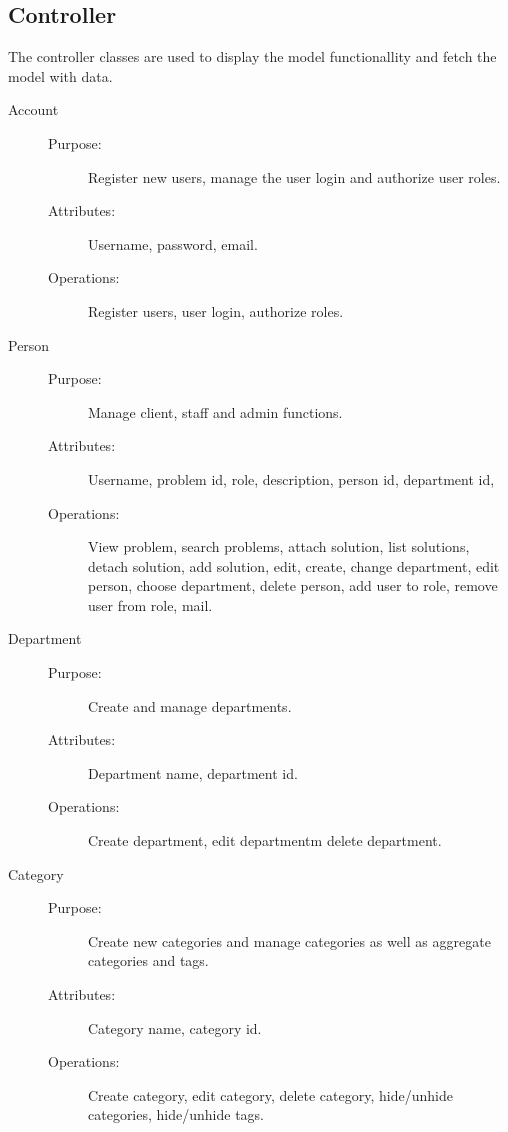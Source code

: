 \subsection{Controller}

The controller classes are used to display the model functionallity and fetch the model with data.

\begin{description}
\item[Account]\hfill
\begin{description}
\item[Purpose:]Register new users, manage the user login and authorize user roles.
\item[Attributes:]Username, password, email.
\item[Operations:]Register users, user login, authorize roles.
\end{description}
\end{description}

\begin{description}
\item[Person]\hfill
\begin{description}
\item[Purpose:]Manage client, staff and admin functions.
\item[Attributes:]Username, problem id, role, description, person id, department id, 
\item[Operations:]View problem, search problems, attach solution, list solutions, detach solution, add solution, edit, create, change department, edit person, choose department, delete person, add user to role, remove user from role, mail.
\end{description}
\end{description}

\begin{description}
\item[Department]\hfill
\begin{description}
\item[Purpose:]Create and manage departments.
\item[Attributes:]Department name, department id.
\item[Operations:]Create department, edit departmentm delete department.
\end{description}
\end{description}

\begin{description}
\item[Category]\hfill
\begin{description}
\item[Purpose:]Create new categories and manage categories as well as aggregate categories and tags.
\item[Attributes:]Category name, category id.
\item[Operations:]Create category, edit category, delete category, hide/unhide categories, hide/unhide tags.
\end{description}
\end{description}

